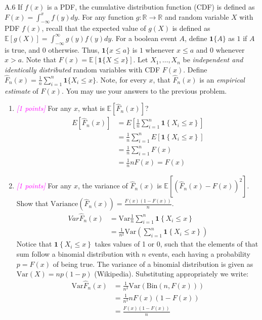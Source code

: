\documentclass{article}
\newcommand{\field}[1]{\mathbb{#1}}
\newcommand{\1}{\mathbf{1}}
\newcommand{\E}{\mathbb{E}}
\newcommand{\R}{\field{R}} %
\newcommand{\points}[1]{\small\textcolor{magenta}{\emph{[#1 points]}} \normalsize}
\begin{document}
A.6 If $f(x)$ is a PDF, the cumulative distribution function (CDF) is  defined as $F(x) = \int_{-\infty}^x f(y) dy$.  For any function $g : \R \rightarrow \R$ and random variable $X$ with PDF $f(x)$, recall that the expected value of $g(X)$ is defined as $\E[g(X)] = \int_{-\infty}^\infty g(y) f(y) dy$. For a boolean event $A$, define $\1\{ A \}$ as $1$ if $A$ is true, and $0$ otherwise. Thus, $\1\{ x \leq a \}$ is $1$ whenever $x \leq a$ and
  $0$ whenever $x > a$.  Note that $F(x) = \E[\1\{X \leq x\}]$.  Let $X_1,\dots,X_n$ be \emph{independent and identically distributed} random variables with CDF $F(x)$.  Define $\widehat{F}_n(x) = \frac{1}{n} \sum_{i=1}^n \1\{X_i \leq x\}$. Note, for every $x$, that $\widehat{F}_n(x)$ is an \emph{empirical estimate} of  $F(x)$. You may use your answers to the previous problem. 
  \begin{enumerate}
  
  \item \points{1} For any $x$, what is $\E[ \widehat{F}_n(x) ]$?
  \begin{align*}
      E[\hat F_n(x)] &= E\left[ \frac{1}{n}\sum_{i=1}^n \mathbf{1} \left\{ X_i \leq x \right\} \right] \\
      &= \frac{1}{n}\sum_{i=1}^n E\left[\mathbf{1} \left\{ X_i \leq x \right\} \right] \\
      &= \frac{1}{n}\sum_{i=1}^n F(x) \\
      &= \frac{1}{n} n F(x) = F(x)
  \end{align*}  
  
  \item \points{1} For any $x$, the variance of $\widehat{F}_n(x)$ is $\E[ ( \widehat{F}_n(x) - F(x) )^2 ]$. Show that $\textrm{Variance}(\widehat{F}_n(x)) = \frac{F(x)(1-F(x))}{n}$. \\
  \begin{align*}
  {Var}\hat F_n(x) &= \text{Var} \frac{1}{n}\sum_{i=1}^n \mathbf{1} \left\{ X_i \leq x \right\} \\
      &= \frac{1}{n^2}\text{Var}\left(\sum_{i=1}^n \mathbf{1} \left\{ X_i \leq x \right\}\right)
  \end{align*}  
  Notice that $\mathbf{1}\left\{X_i\leq x\right\}$ takes values of 1 or 0, such that the elements of that sum follow a binomial distribution with $n$ events, each having a probability $p=F(x)$ of being true. The variance of a binomial distribution is given as $\text{Var}(X)=np(1-p)$ (Wikipedia). Substituting appropriately we write: 
  \begin{align*}
  \text{Var}\hat F_n(x) &= \frac{1}{n^2}\text{Var}(\text{Bin}(n, F(x))) \\
  &= \frac{1}{n^2}nF(x)\left(1-F(x)\right) \\
  &= \frac{F(x)\left(1-F(x)\right)}{n} 
  \end{align*} 
  

\end{enumerate}
\end{document}
